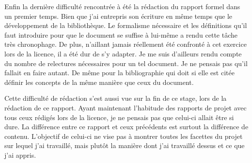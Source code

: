 Enfin la dernière difficulté rencontrée à été la rédaction du rapport formel 
dans un premier temps. Bien que j'ai entrepris son écriture en même temps que 
le développement de la bibliothèque. Le formalisme nécessaire et les définitions 
qu'il faut introduire pour que le document se suffise à lui-même a rendu cette 
tâche très chronophage. De plus, n'aillant jamais réellement été confronté à 
cet exercice lors de la licence, il a été dur de s'y adapter. Je me suis 
d'ailleurs rendu compte du nombre de relectures nécessaires pour un tel 
document. Je ne pensais pas qu'il fallait en faire autant. De même pour la 
bibliographie qui doit si elle est citée définir les concepts de la même manière 
que ceux du document.

Cette difficulté de rédaction s'est aussi vue sur la fin de ce stage, lors de la 
rédaction de ce rapport. Ayant maintenant l'habitude des rapports de projet 
avec tous ceux rédigés lors de la licence, je ne pensais pas que celui-ci allait 
être si dure. La différence entre ce rapport et ceux précédents est surtout la 
différence de contenu. L'objectif de celui-ci ne vise pas à montrer toutes les 
facettes du projet sur lequel j'ai travaillé, mais plutôt la manière dont j'ai 
travaillé dessus et ce que j'ai appris. 

